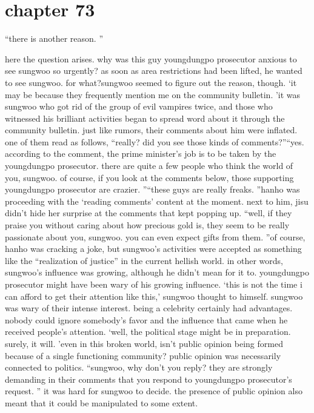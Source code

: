 \section{chapter 73}

                            “there is another reason.
”




here the question arises.
 why was this guy youngdungpo prosecutor anxious to see sungwoo so urgently? as soon as area restrictions had been lifted, he wanted to see sungwoo.
 for what?sungwoo seemed to figure out the reason, though.
‘it may be because they frequently mention me on the community bulletin.
’it was sungwoo who got rid of the group of evil vampires twice, and those who witnessed his brilliant activities began to spread word about it through the community bulletin.
 just like rumors, their comments about him were inflated.
one of them read as follows, “really? did you see those kinds of comments?”“yes.
 according to the comment, the prime minister’s job is to be taken by the youngdungpo prosecutor.
 there are quite a few people who think the world of you, sungwoo.
 of course, if you look at the comments below, those supporting youngdungpo prosecutor are crazier.
”“these guys are really freaks.
”hanho was proceeding with the ‘reading comments’ content at the moment.
next to him, jisu didn’t hide her surprise at the comments that kept popping up.
“well, if they praise you without caring about how precious gold is, they seem to be really passionate about you, sungwoo.
 you can even expect gifts from them.
”of course, hanho was cracking a joke, but sungwoo’s activities were accepted as something like the “realization of justice” in the current hellish world.
in other words, sungwoo’s influence was growing, although he didn’t mean for it to.
 youngdungpo prosecutor might have been wary of his growing influence.
‘this is not the time i can afford to get their attention like this,’ sungwoo thought to himself.
sungwoo was wary of their intense interest.
 being a celebrity certainly had advantages.
nobody could ignore somebody’s favor and the influence that came when he received people’s attention.
‘well, the political stage might be in preparation.
 surely, it will.
’even in this broken world, isn’t public opinion being formed because of a single functioning community? public opinion was necessarily connected to politics.
“sungwoo, why don’t you reply? they are strongly demanding in their comments that you respond to youngdungpo prosecutor’s request.
”
it was hard for sungwoo to decide.
 the presence of public opinion also meant that it could be manipulated to some extent.
